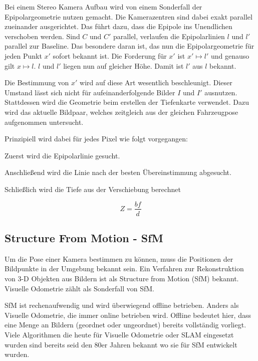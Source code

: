 Bei einem Stereo Kamera Aufbau wird von einem Sonderfall der Epipolargeometrie nutzen gemacht. Die Kamerazentren sind dabei exakt parallel zueinander ausgerichtet. Das führt dazu, dass die Epipole ins Unendlichen verschoben werden. Sind $C$ und $C'$ parallel, verlaufen die Epipolarlinien $l$ und $l'$ parallel zur Baseline. Das besondere daran ist, das nun die Epipolargeometrie für jeden Punkt $x'$ sofort bekannt ist. Die Forderung für $x'$ ist $x' \mapsto l'$ und genauso gilt $x \mapsto l$. $l$ und $l'$ liegen nun auf gleicher Höhe. Damit ist $l'$ aus $l$ bekannt.
\newline

Die Bestimmung von $x'$ wird auf diese Art wesentlich beschleunigt. Dieser Umstand lässt sich nicht für aufeinanderfolgende Bilder $I$ und $I'$ ausnutzen. Stattdessen wird die Geometrie beim erstellen der Tiefenkarte verwendet. Dazu wird das aktuelle Bildpaar, welches zeitgleich aus der gleichen Fahrzeugpose aufgenommen untersucht.
\newline 

Prinzipiell wird dabei für jedes Pixel wie folgt vorgegangen:

Zuerst wird die Epipolarlinie gesucht. 

Anschlie{\ss}end wird die Linie nach der besten Übereinstimmung abgesucht.

Schlie{\ss}lich wird die Tiefe aus der Verschiebung berechnet

\begin{equation}
  Z = \frac{bf}{d}
\end{equation}
\subsection{Structure From Motion - SfM}
Um die Pose einer Kamera bestimmen zu können, muss die Positionen der Bildpunkte in der Umgebung bekannt sein. Ein Verfahren zur Rekonstruktion von 3-D Objekten aus Bildern ist als Structure from Motion (SfM) bekannt. Visuelle Odometrie  zählt als Sonderfall von SfM.
\newline

SfM ist rechenaufwendig und wird überwiegend offline betrieben. Anders als Visuelle Odometrie, die immer online betrieben wird. Offline bedeutet hier, dass eine Menge an Bildern (geordnet oder ungeordnet) bereits vollständig vorliegt. Viele Algorithmen die heute für Visuelle Odometrie oder SLAM eingesetzt wurden sind bereits seid den 80er Jahren bekannt wo sie für SfM entwickelt wurden. \cite{LonguetHiggins1981ACA}
\newline

